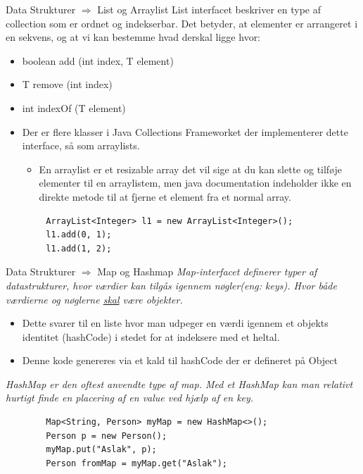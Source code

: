 \documentclass[10pt,aspectratio=1610]{beamer}
\begin{document}
\begin{frame}[fragile]{Data Strukturer $\Rightarrow$ List og Arraylist}
    List interfacet beskriver en type af collection som er ordnet og indekserbar. Det betyder, at elementer er arrangeret i en sekvens, og at vi kan bestemme hvad derskal ligge hvor:
    \begin{itemize}
        \item boolean add (int index, T element)
        \item T remove (int index)
        \item int indexOf (T element)
    \end{itemize}
    \begin{itemize}
        \item Der er flere klasser i Java Collections Frameworket der implementerer dette interface, så som arraylists.
        \begin{itemize}
            \item En arraylist er et resizable array det vil sige at du kan slette og tilføje elementer til en arraylistem, men java documentation indeholder ikke en direkte metode til at fjerne et element fra et normal array.
        \end{itemize}
    \end{itemize}
    \begin{lstlisting}
        ArrayList<Integer> l1 = new ArrayList<Integer>();
        l1.add(0, 1);
        l1.add(1, 2);
    \end{lstlisting}
\end{frame}


\begin{frame}[fragile]{Data Strukturer $\Rightarrow$ Map og Hashmap}
    \textit{Map-interfacet definerer typer af datastrukturer, hvor værdier kan tilgås igennem 
    nøgler(eng: keys). Hvor både værdierne og nøglerne \alert{\underline{skal}} være objekter.}

    \begin{itemize}
        \item Dette svarer til en liste hvor man udpeger en værdi igennem et objekts identitet (hashCode)  i stedet for at indeksere med et heltal.
        \item Denne kode genereres via et kald til \alert{hashCode} der er defineret på \alert{Object}
    \end{itemize}

    \textit{HashMap er den oftest anvendte type af map. Med et HashMap kan man relativt hurtigt finde en placering af en value ved hjælp af en key.}

    \begin{lstlisting}
        Map<String, Person> myMap = new HashMap<>();
        Person p = new Person();
        myMap.put("Aslak", p);
        Person fromMap = myMap.get("Aslak");
    \end{lstlisting}
\end{frame}
\end{document}
